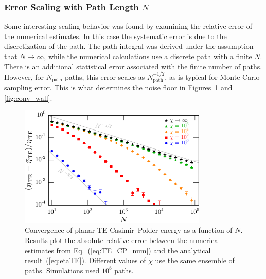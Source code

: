 \subsubsection{Error Scaling with Path Length $N$}
\label{sec:TE_convergence}
Some interesting scaling behavior was found by examining the relative error of the numerical 
estimates.  
In this case the systematic error is due to the discretization of the path.
The path integral was derived under the assumption that $N\rightarrow\infty$, while the numerical
calculations use a discrete path with a finite $N$.  
There is an additional statistical error associated with the finite number of paths.   However, for $N_{\text{path}}$ paths,
this error scales as $N_{\text{path}}^{-1/2}$, as is typical for Monte Carlo sampling error.  This is what determines
the noise floor in Figures~\ref{fig:conv_atom} and \ref{fig:conv_wall}.

\begin{figure}
  \centering
  \includegraphics[width=0.8\textwidth]{fig/temp/conv_TEatomN3}
  \caption[Convergence of planar TE Casimir--Polder energy as function of $N$.  ]{
    Convergence of planar TE Casimir--Polder energy as a function of $N$.  
    Results plot the absolute relative error between the numerical estimates from Eq.~(\ref{eq:TE_CP_num})
    and the analytical result~(\ref{eq:etaTE}). 
    Different values of $\chi$ use the same ensemble of paths.
    Simulations used $10^8$ paths.}
  \label{fig:conv_atom}
\end{figure}

